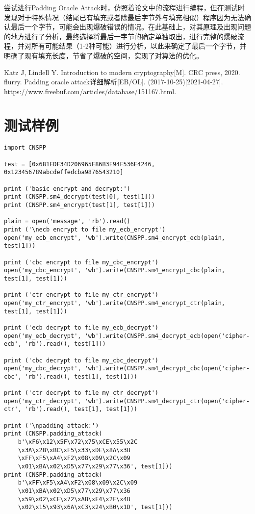 \documentclass[a4paper, zihao=-4, UTF-8]{ctexart}
\begin{document}
			尝试进行Padding Oracle Attack时，仿照着论文中的流程进行编程，但在测试时发现对于特殊情况（结尾已有填充或者除最后字节外与填充相似）程序因为无法确认最后一个字节，可能会出现爆破错误的情况。在此基础上，对其原理及出现问题的地方进行了分析，最终选择将最后一字节的确定单独取出，进行完整的爆破流程，并对所有可能结果（1-2种可能）进行分析，以此来确定了最后一个字节，并明确了现有填充长度，节省了爆破的空间，实现了对算法的优化。
		\newpage
		\begin{thebibliography}{99}
			Katz J, Lindell Y. Introduction to modern cryptography[M]. CRC press, 2020.
			flurry. Padding oracle attack详细解析[EB/OL]. (2017-10-25)[2021-04-27]. https://www.freebuf.com/articles/database/151167.html.
		\end{thebibliography}
		\newpage
		\appendix
			\section{测试样例}\label{apx:testdata}
			\begin{lstlisting}[caption={SM4实验测试样例}, label={lst:sm4testdata}]
import CNSPP

test = [0x681EDF34D206965E86B3E94F536E4246, 0x123456789abcdeffedcba9876543210]

print ('basic encrypt and decrypt:')
print (CNSPP.sm4_decrypt(test[0], test[1]))
print (CNSPP.sm4_encrypt(test[1], test[1]))

plain = open('message', 'rb').read()
print ('\necb encrypt to file my_ecb_encrypt')
open('my_ecb_encrypt', 'wb').write(CNSPP.sm4_encrypt_ecb(plain, test[1]))

print ('cbc encrypt to file my_cbc_encrypt')
open('my_cbc_encrypt', 'wb').write(CNSPP.sm4_encrypt_cbc(plain, test[1], test[1]))

print ('ctr encrypt to file my_ctr_encrypt')
open('my_ctr_encrypt', 'wb').write(CNSPP.sm4_encrypt_ctr(plain, test[1], test[1]))

print ('ecb decrypt to file my_ecb_decrypt')
open('my_ecb_decrypt', 'wb').write(CNSPP.sm4_decrypt_ecb(open('cipher-ecb', 'rb').read(), test[1]))

print ('cbc decrypt to file my_cbc_decrypt')
open('my_cbc_decrypt', 'wb').write(CNSPP.sm4_decrypt_cbc(open('cipher-cbc', 'rb').read(), test[1], test[1]))

print ('ctr decrypt to file my_ctr_decrypt')
open('my_ctr_decrypt', 'wb').write(CNSPP.sm4_decrypt_ctr(open('cipher-ctr', 'rb').read(), test[1], test[1]))

print ('\npadding attack:')
print (CNSPP.padding_attack(
	b'\xF6\x12\x5F\x72\x75\xCE\x55\x2C
	\x3A\x2B\xBC\xF5\x33\xDE\x8A\x3B
	\xFF\xF5\xA4\xF2\x08\x09\x2C\x09
	\x01\xBA\x02\xD5\x77\x29\x77\x36', test[1]))
print (CNSPP.padding_attack(
	b'\xFF\xF5\xA4\xF2\x08\x09\x2C\x09
	\x01\xBA\x02\xD5\x77\x29\x77\x36
	\x59\x02\xCE\x72\xAB\xE4\x2F\x4B
	\x02\x15\x93\x6A\xC3\x24\xB0\x1D', test[1]))
				
			\end{lstlisting}
\end{document}
